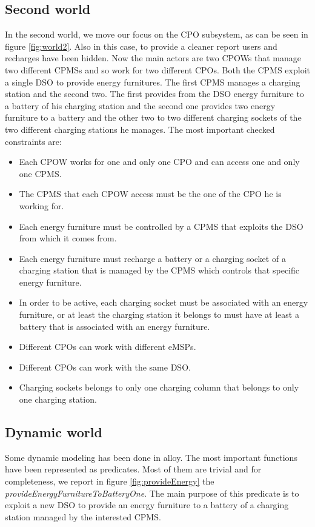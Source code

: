 \documentclass[a4paper]{report}
\begin{document}
\subsection{Second world}
In the second world, we move our focus on the CPO subsystem, as can be seen in figure \ref{fig:world2}. Also in this case, to provide a cleaner report users and recharges have been hidden. Now the main actors are two CPOWs that manage two different CPMSs and so work for two different CPOs. Both the CPMS exploit a single DSO to provide energy furnitures. The first CPMS manages a charging station and the second two. The first provides from the DSO energy furniture to a battery of his charging station and the second one provides two energy furniture to a battery and the other two to two different charging sockets of the two different charging stations he manages. The most important checked constraints are:
\begin{itemize}
    \item Each CPOW works for one and only one CPO and can access one and only one CPMS.
    \item The CPMS that each CPOW access must be the one of the CPO he is working for.
    \item Each energy furniture must be controlled by a CPMS that exploits the DSO from which it comes from.
    \item Each energy furniture must recharge a battery or a charging socket of a charging station that is managed by the CPMS which controls that specific energy furniture.
    \item In order to be active, each charging socket must be associated with an energy furniture, or at least the charging station it belongs to must have at least a battery that is associated with an energy furniture.
    \item Different CPOs can work with different eMSPs.
    \item Different CPOs can work with the same DSO.
    \item Charging sockets belongs to only one charging column that belongs to only one charging station.
\end{itemize}

\subsection{Dynamic world}
Some dynamic modeling has been done in alloy. The most important functions have been represented as predicates. Most of them are trivial and for completeness, we report in figure \ref{fig:provideEnergy} the \textit{provideEnergyFurnitureToBatteryOne}. The main purpose of this predicate is to exploit a new DSO to provide an energy furniture to a battery of a charging station managed by the interested CPMS.
\end{document}
